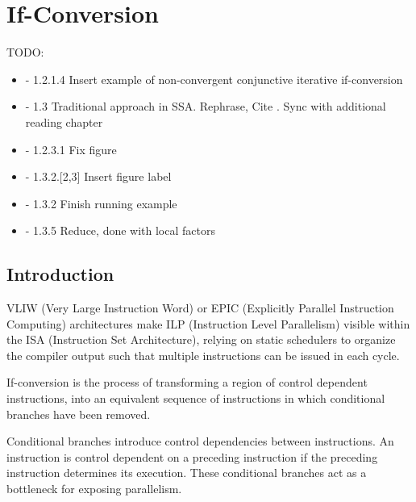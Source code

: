 \chapter{If-Conversion }\label{chap:if_conversion}
\label{chap:if_conv}
\graphicspath{{img/}{if_conversion/img/}{part4/if_conversion/img/}}

\newcommand\cond{~?~}
\newcommand{\annotation}[1]{%
  \marginpar{\small\itshape\color{red}#1}}


TODO:
\begin{itemize}
\item  - 1.2.1.4 Insert example of non-convergent conjunctive iterative if-conversion
\item  - 1.3     Traditional approach in SSA. Rephrase, Cite \cite{Stoutchinin_Gao_2004}. Sync with additional reading chapter
\item  - 1.2.3.1 Fix figure
\item  - 1.3.2.[2,3] Insert figure label
\item  - 1.3.2   Finish running example 
\item  - 1.3.5   Reduce, done with local factors
 \end{itemize}

\section{Introduction}

VLIW (Very Large Instruction Word) or EPIC (Explicitly Parallel Instruction Computing) architectures make ILP (Instruction Level Parallelism) visible within the ISA (Instruction Set Architecture), relying on static schedulers to organize the compiler output such that multiple instructions can be issued in each cycle.

If-conversion is the process of transforming a region of control dependent instructions, into an equivalent sequence of instructions in which conditional branches have been removed.

Conditional branches introduce control dependencies between instructions. An instruction is control dependent on a preceding instruction if the preceding instruction determines its execution. These conditional branches act as a bottleneck for exposing parallelism.

